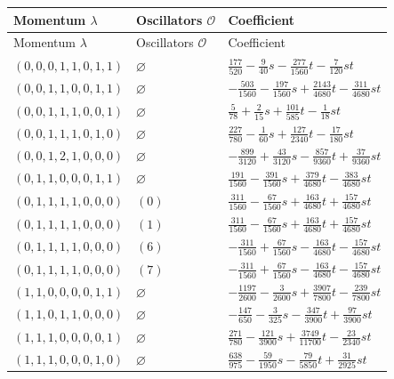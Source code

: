 \begingroup\scriptsize
\setlength{\tabcolsep}{5pt}
\begin{longtable}{@{}lll@{}}
\toprule
Momentum $\lambda$ & Oscillators $\mathcal O$ & Coefficient\\
\midrule\endfirsthead
\toprule
Momentum $\lambda$ & Oscillators $\mathcal O$ & Coefficient\\
\midrule\endhead
\bottomrule\endfoot
$(0,0,0,1,1,0,1,1)$ & $\varnothing$ & $\frac{177}{520}-\frac{9}{40}s-\frac{277}{1560}t-\frac{7}{120}st$\\
$(0,0,1,1,0,0,1,1)$ & $\varnothing$ & $-\frac{503}{1560}-\frac{197}{1560}s+\allowbreak \frac{2143}{4680}t-\frac{311}{4680}st$\\
$(0,0,1,1,1,0,0,1)$ & $\varnothing$ & $\frac{5}{78}+\allowbreak \frac{2}{15}s+\allowbreak \frac{101}{585}t-\frac{1}{18}st$\\
$(0,0,1,1,1,0,1,0)$ & $\varnothing$ & $\frac{227}{780}-\frac{1}{60}s+\allowbreak \frac{127}{2340}t-\frac{17}{180}st$\\
$(0,0,1,2,1,0,0,0)$ & $\varnothing$ & $-\frac{899}{3120}+\allowbreak \frac{43}{3120}s-\frac{857}{9360}t+\allowbreak \frac{37}{9360}st$\\
$(0,1,1,0,0,0,1,1)$ & $\varnothing$ & $\frac{191}{1560}-\frac{391}{1560}s+\allowbreak \frac{379}{4680}t-\frac{383}{4680}st$\\
$(0,1,1,1,1,0,0,0)$ & $(0)$ & $\frac{311}{1560}-\frac{67}{1560}s+\allowbreak \frac{163}{4680}t+\allowbreak \frac{157}{4680}st$\\
$(0,1,1,1,1,0,0,0)$ & $(1)$ & $\frac{311}{1560}-\frac{67}{1560}s+\allowbreak \frac{163}{4680}t+\allowbreak \frac{157}{4680}st$\\
$(0,1,1,1,1,0,0,0)$ & $(6)$ & $-\frac{311}{1560}+\allowbreak \frac{67}{1560}s-\frac{163}{4680}t-\frac{157}{4680}st$\\
$(0,1,1,1,1,0,0,0)$ & $(7)$ & $-\frac{311}{1560}+\allowbreak \frac{67}{1560}s-\frac{163}{4680}t-\frac{157}{4680}st$\\
$(1,1,0,0,0,0,1,1)$ & $\varnothing$ & $-\frac{1197}{2600}-\frac{3}{2600}s+\allowbreak \frac{3907}{7800}t-\frac{239}{7800}st$\\
$(1,1,0,1,1,0,0,0)$ & $\varnothing$ & $-\frac{147}{650}-\frac{3}{325}s-\frac{347}{3900}t+\allowbreak \frac{97}{3900}st$\\
$(1,1,1,0,0,0,0,1)$ & $\varnothing$ & $\frac{271}{780}-\frac{121}{3900}s+\allowbreak \frac{3749}{11700}t-\frac{23}{2340}st$\\
$(1,1,1,0,0,0,1,0)$ & $\varnothing$ & $\frac{638}{975}-\frac{59}{1950}s-\frac{79}{5850}t+\allowbreak \frac{31}{2925}st$\\

\end{longtable}
